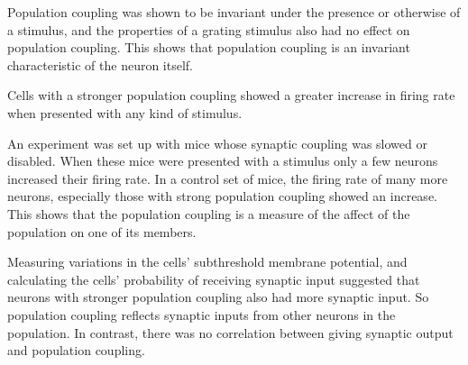 \documentclass[a4paper,12pt]{article}
\theoremstyle{definition}
\begin{document}
Population coupling was shown to be invariant under the presence or otherwise of a stimulus, and the properties of a grating stimulus also had no effect on population coupling. This shows that population coupling is an invariant characteristic of the neuron itself.

Cells with a stronger population coupling showed a greater increase in firing rate when presented with any kind of stimulus.

An experiment was set up with mice whose synaptic coupling was slowed or disabled. When these mice were presented with a stimulus only a few neurons increased their firing rate. In a control set of mice, the firing rate of many more neurons, especially those with strong population coupling showed an increase. This shows that the population coupling is a measure of the affect of the population on one of its members. 

Measuring variations in the cells' subthreshold membrane potential, and calculating the cells' probability of receiving synaptic input suggested that neurons with stronger population coupling also had more synaptic input. So population coupling reflects synaptic inputs from other neurons in the population. In contrast, there was no correlation between giving synaptic output and population coupling.
\end{document}
